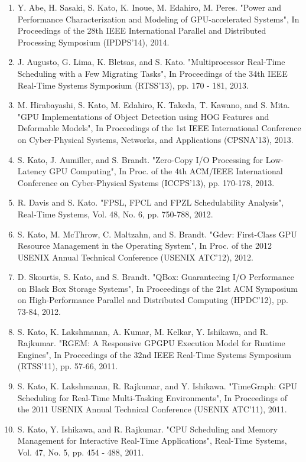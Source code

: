 \documentclass[10pt,letterpaper]{article}
\begin{document}
\begin{enumerate}
 \item Y. Abe, H. Sasaki, S. Kato, K. Inoue, M. Edahiro,
       M. Peres. "Power and Performance Characterization and Modeling of
       GPU-accelerated Systems", In Proceedings of the 28th IEEE
       International Parallel and Distributed Processing Symposium
       (IPDPS'14), 2014.

 \item  J. Augusto, G. Lima, K. Bletsas, and S. Kato. "Multiprocessor
	Real-Time Scheduling with a Few Migrating Tasks", In Proceedings
	of the 34th IEEE Real-Time Systems Symposium (RTSS'13), pp. 170
	- 181, 2013.

 \item M. Hirabayashi, S. Kato, M. Edahiro, K. Takeda, T. Kawano, and
       S. Mita. "GPU Implementations of Object Detection using HOG
       Features and Deformable Models", In Proceedings of the 1st IEEE
       International Conference on Cyber-Physical Systems, Networks, and
       Applications (CPSNA'13), 2013.

 \item S. Kato, J. Aumiller, and S. Brandt. "Zero-Copy I/O Processing
       for Low-Latency GPU Computing", In Proc. of the 4th ACM/IEEE
       International Conference on Cyber-Physical Systems 
       (ICCPS'13), pp. 170-178, 2013.

 \item R. Davis and S. Kato. "FPSL, FPCL and FPZL Schedulability
       Analysis", Real-Time Systems, Vol. 48, No. 6, pp. 750-788, 2012.

 \item S. Kato, M. McThrow, C. Maltzahn, and S. Brandt. "Gdev:
       First-Class GPU Resource Management in the Operating System", In
       Proc. of the 2012 USENIX Annual Technical Conference
       (USENIX ATC'12), 2012.

 \item D. Skourtis, S. Kato, and S. Brandt. "QBox: Guaranteeing I/O
       Performance on Black Box Storage Systems", In Proceedings of the
       21st ACM Symposium on High-Performance Parallel and Distributed
       Computing (HPDC'12), pp. 73-84, 2012.

 \item S. Kato, K. Lakshmanan, A. Kumar, M. Kelkar, Y. Ishikawa, and
       R. Rajkumar. "RGEM: A Responsive GPGPU Execution Model for
       Runtime Engines", In Proceedings of the 32nd IEEE Real-Time
       Systems Symposium (RTSS'11), pp. 57-66, 2011.

 \item S. Kato, K. Lakshmanan, R. Rajkumar, and Y. Ishikawa. "TimeGraph:
       GPU Scheduling for Real-Time Multi-Tasking Environments", In
       Proceedings of the 2011 USENIX Annual Technical Conference
       (USENIX ATC'11), 2011.

 \item S. Kato, Y. Ishikawa, and R. Rajkumar. "CPU Scheduling and Memory
       Management for Interactive Real-Time Applications", Real-Time
       Systems, Vol. 47, No. 5, pp. 454 - 488, 2011.
\end{enumerate}


\end{document}

